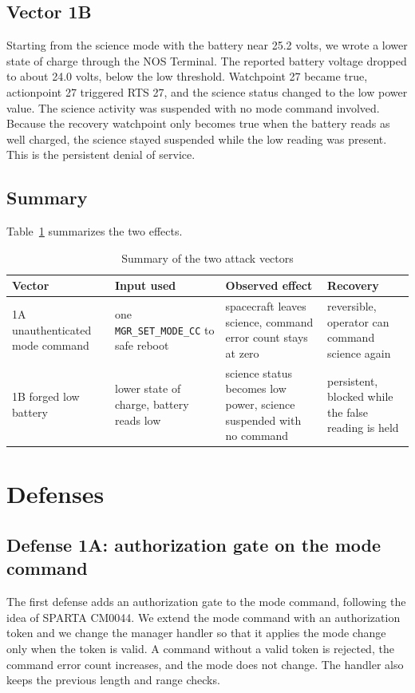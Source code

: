 \documentclass[conference,letterpaper,10pt]{IEEEtran}
\begin{document}
\subsection{Vector 1B}
Starting from the science mode with the battery near 25.2 volts, we wrote a lower state of charge through the NOS Terminal. The reported battery voltage dropped to about 24.0 volts, below the low threshold. Watchpoint 27 became true, actionpoint 27 triggered RTS 27, and the science status changed to the low power value. The science activity was suspended with no mode command involved. Because the recovery watchpoint only becomes true when the battery reads as well charged, the science stayed suspended while the low reading was present. This is the persistent denial of service.

\subsection{Summary}
Table~\ref{tab:attacks} summarizes the two effects.

\begin{table}[t]
\caption{Summary of the two attack vectors}
\label{tab:attacks}
\centering
\footnotesize
\begin{tabular}{@{}p{14mm}p{18mm}p{22mm}p{16mm}@{}}
\toprule
Vector & Input used & Observed effect & Recovery \\
\midrule
1A unauthenticated mode command & one \texttt{MGR\_SET\_MODE\_CC} to safe reboot & spacecraft leaves science, command error count stays at zero & reversible, operator can command science again \\
\addlinespace
1B forged low battery & lower state of charge, battery reads low & science status becomes low power, science suspended with no command & persistent, blocked while the false reading is held \\
\bottomrule
\end{tabular}
\end{table}

\section{Defenses}

\subsection{Defense 1A: authorization gate on the mode command}
The first defense adds an authorization gate to the mode command, following the idea of SPARTA CM0044. We extend the mode command with an authorization token and we change the manager handler so that it applies the mode change only when the token is valid. A command without a valid token is rejected, the command error count increases, and the mode does not change. The handler also keeps the previous length and range checks.
\end{document}
